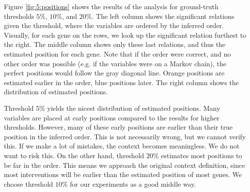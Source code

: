 Figure \ref{fig:5:positions} shows the results of the analysis for ground-truth thresholds $5\%$, $10\%$, and $20\%$. The left column shows the significant relations given the threshold, where the variables are ordered by the inferred order. Visually, for each gene on the rows, we look up the significant relation furthest to the right. The middle column shows only these last relations, and thus the estimated position for each gene. Note that if the order were correct, and no other order was possible (e.g. if the variables were on a Markov chain), the perfect positions would follow the gray diagonal line. Orange positions are estimated earlier in the order, blue positions later. The right column shows the distribution of estimated positions. 

Threshold $5\%$ yields the nicest distribution of estimated positions. Many variables are placed at early positions compared to the results for higher thresholds. However, many of these early positions are earlier than their true position in the inferred order. This is not necessarily wrong, but we cannot verify this. If we make a lot of mistakes, the context becomes meaningless. We do not want to risk this. On the other hand, threshold $20\%$ estimates most positions to be far in the order. This means we approach the original context definition, since most interventions will be earlier than the estimated position of most genes. We choose threshold $10\%$ for our experiments as a good middle way.













